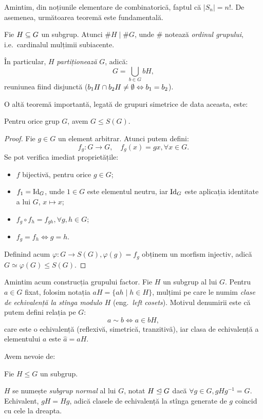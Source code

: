 Amintim, din noțiunile elementare de combinatorică, faptul că $ |S_n| = n! $.
De asemenea, următoarea teoremă este fundamentală.
\begin{theorem}[Lagrange]\label{thm:lagrange-gr} 
  Fie $ H \subseteq G $ un subgrup. Atunci $ \# H \mid \# G $, unde $ \# $ notează
  \emph{ordinul grupului}, i.e.\ cardinalul mulțimii subiacente.

  În particular, $ H $ \emph{partiționează} $ G $, adică:
  \[
    G = \bigcup_{b \in G} bH,
  \]
  reuniunea fiind disjunctă ($ b_1 H \cap b_2 H \neq \emptyset \Leftrightarrow b_1 = b_2 $).
\end{theorem}

O altă teoremă importantă, legată de grupuri simetrice de data aceasta, este:
\begin{theorem}[Cayley]\label{thm:cayley} 
  Pentru orice grup $ G $, avem $ G \leq S(G) $.
\end{theorem}
\begin{proof}
  Fie $ g \in G $ un element arbitrar. Atunci putem defini:
  \[
    f_g : G \to G, \quad f_g(x) = gx, \forall x \in G.
  \]
  Se pot verifica imediat proprietățile:
  \begin{itemize}
  \item $ f $ bijectivă, pentru orice $ g \in G $;
  \item $ f_1 = \mathrm{Id}_G $, unde $ 1 \in G $ este elementul neutru, iar
    $ \mathrm{Id}_G $ este aplicația identitate a lui $ G $, $ x \mapsto x $;
  \item $ f_g \circ f_h = f_{gh}, \forall g, h \in G $;
  \item $ f_g = f_h \Leftrightarrow g = h $.
  \end{itemize}
  
  Definind acum $ \varphi : G \to S(G), \varphi(g) = f_g $
  obținem un morfism injectiv, adică $ G \simeq \varphi(G) \leq S(G) $.
\end{proof}

Amintim acum construcția grupului factor. Fie $ H $ un subgrup al lui $ G $.
Pentru $ a \in G $ fixat, folosim notația $ aH = \{ ah \mid h \in H \} $,
mulțimi pe care le numim \emph{clase de echivalență la stînga modulo $ H $}
(eng.\ \emph{left cosets}). Motivul denumirii este că putem defini relația
pe $ G $:
\[
  a \sim b \Leftrightarrow a \in bH,
\]
care este o echivalență (reflexivă, simetrică, tranzitivă), iar clasa de
echivalență a elementului $ a $ este $ \widehat{a} = aH $.

Avem nevoie de:
\begin{definition}\label{def:subgr-normal} 
  Fie $ H \leq G $ un subgrup.

  $ H $ se numește \emph{subgrup normal} al lui $ G $, notat $ H \trianglelefteq G $
  dacă $ \forall g \in G, gHg^{-1} = G $. Echivalent, $ gH = Hg $, adică
  clasele de echivalență la stînga generate de $ g $ coincid cu cele la dreapta.
\end{definition}

